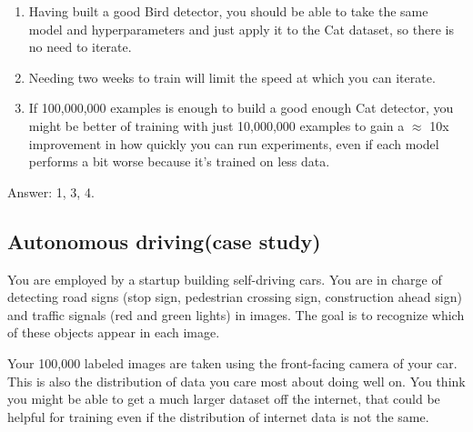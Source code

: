 \documentclass[12pt]{article}
\numberwithin{equation}{section}
\begin{document}
\begin{enumerate}
\begin{enumerate}
		\item Having built a good Bird detector, you should be able to take the same model and hyperparameters and just apply it to the Cat dataset, so there is no need to iterate.
		\item Needing two weeks to train will limit the speed at which you can iterate.
		\item If 100,000,000 examples is enough to build a good enough Cat detector, you might be better of training with just 10,000,000 examples to gain a $\approx$ 10x improvement in how quickly you can run experiments, even if each model performs a bit worse because it's trained on less data.
	\end{enumerate} \par
	Answer: 1, 3, 4.
\end{enumerate}
\subsection{Autonomous driving(case study)}
	You are employed by a startup building self-driving cars. You are in charge of detecting road signs (stop sign, pedestrian crossing sign, construction ahead sign) and traffic signals (red and green lights) in images. The goal is to recognize which of these objects appear in each image. \par
	Your 100,000 labeled images are taken using the front-facing camera of your car. This is also the distribution of data you care most about doing well on. You think you might be able to get a much larger dataset off the internet, that could be helpful for training even if the distribution of internet data is not the same.\par
\end{document}
